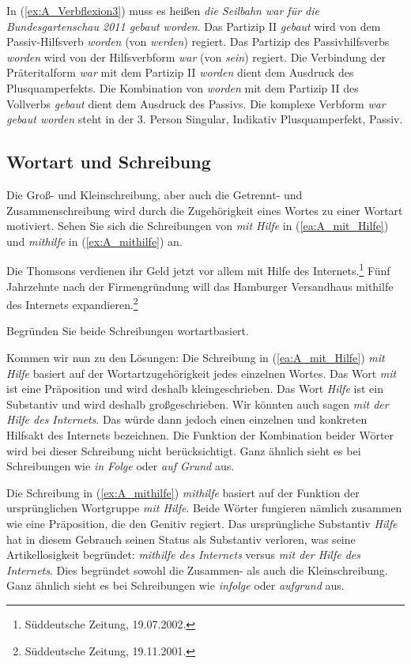 In (\ref{ex:A_Verbflexion3}) muss es heißen \textit{die Seilbahn war für die Bundesgartenschau 2011 gebaut worden}. Das Partizip II \textit{gebaut} wird von dem Passiv-Hilfsverb \textit{worden} (von \textit{werden}) regiert. Das Partizip des Passivhilfsverbs \textit{worden} wird von der Hilfsverbform \textit{war} (von \textit{sein}) regiert. Die Verbindung der Präteritalform \textit{war} mit dem Partizip II \textit{worden} dient dem Ausdruck des Plusquamperfekts. Die Kombination von \textit{worden} mit dem Partizip II des Vollverbs \textit{gebaut} dient dem Ausdruck des Passivs. Die komplexe Verbform \textit{war gebaut worden} steht in der 3. Person Singular, Indikativ Plusquamperfekt, Passiv.
 
 
\subsection{Wortart und Schreibung}\label{subsection:A_Wortart_Schreibung}

Die Groß- und Kleinschreibung, aber auch die Getrennt- und Zusammenschreibung wird durch die Zugehörigkeit eines Wortes zu einer Wortart motiviert. Sehen Sie sich die Schreibungen von \textit{mit Hilfe} in (\ref{ea:A_mit_Hilfe}) und \textit{mithilfe} in (\ref{ex:A_mithilfe}) an.

\ea \label{ea:A_mithilfe}
\ea \label{ea:A_mit_Hilfe} Die Thomsons verdienen ihr Geld jetzt vor allem mit Hilfe des Internets.\footnote{Süddeutsche Zeitung, 19.07.2002.}
\ex \label{ex:A_mithilfe} Fünf Jahrzehnte nach der Firmengründung will das Hamburger Versandhaus mithilfe des Internets expandieren.\footnote{Süddeutsche Zeitung, 19.11.2001.}
\z 
\z 

Begründen Sie beide Schreibungen wortartbasiert. 


Kommen wir nun zu den Lösungen: Die Schreibung in (\ref{ea:A_mit_Hilfe}) \textit{mit Hilfe} basiert auf der Wortartzugehörigkeit jedes einzelnen Wortes. Das Wort \textit{mit} ist eine Präposition und wird deshalb kleingeschrieben. Das Wort \textit{Hilfe} ist ein Substantiv und wird deshalb großgeschrieben. Wir könnten auch sagen \textit{mit der Hilfe des Internets}. Das würde dann jedoch einen einzelnen und konkreten Hilfsakt des Internets bezeichnen. Die Funktion der Kombination beider Wörter wird bei dieser Schreibung nicht berücksichtigt. Ganz ähnlich sieht es bei Schreibungen wie \textit{in Folge} oder \textit{auf Grund} aus.

Die Schreibung in (\ref{ex:A_mithilfe}) \textit{mithilfe} basiert auf der Funktion der ursprünglichen Wortgruppe \textit{mit Hilfe}. Beide Wörter fungieren nämlich zusammen wie eine Präposition, die den Genitiv regiert. Das ursprüngliche Substantiv \textit{Hilfe} hat in diesem Gebrauch seinen Status als Substantiv verloren, was seine Artikellosigkeit begründet: \textit{mithilfe des Internets} versus \textit{mit der Hilfe des Internets}. Dies begründet sowohl die Zusammen- als auch die Kleinschreibung. Ganz ähnlich sieht es bei Schreibungen wie \textit{infolge} oder \textit{aufgrund} aus.


